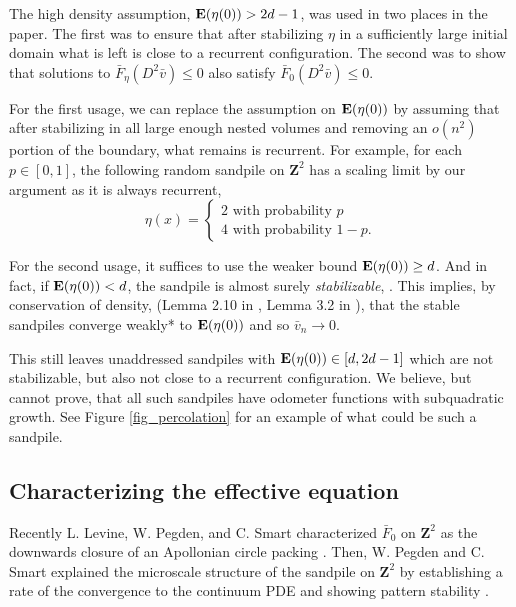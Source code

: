 \documentclass[12pt]{amsart}
\newcommand{\Z}{\mathbf{Z}}
\newcommand{\E}{\mathop{\bf E{}}}
\begin{document}
The high density assumption, $\E(\eta(0)) > 2 d -1$, was used in two places in the paper. The first was to ensure 
that after stabilizing $\eta$ in a sufficiently large initial domain what is left is close to a recurrent configuration. 
The second was to show that solutions to $\bar{F}_{\eta}(D^2 \bar{v}) \leq 0$ also satisfy $\bar{F}_0(D^2 \bar{v}) \leq 0$.  

For the first usage, we can replace the assumption on $\E(\eta(0))$ by assuming that after stabilizing in all large enough nested volumes and removing an $o(n^2)$ portion of the boundary, what remains is recurrent.  For example, for each $p \in [0,1]$,
the following random sandpile on $\Z^2$ has a scaling limit by our argument as it is always recurrent,
\[
\eta(x) =  \begin{cases} 
2  \mbox{ with probability $p$}  \\
4 \mbox{ with probability $1 - p$}.
\end{cases}
\]

For the second usage, it suffices to use the weaker bound $\E(\eta(0)) \geq d$. And in fact,  if $\E(\eta(0)) < d$, the sandpile is almost surely {\it stabilizable}, \cite{fey2009stabilizability}. This implies, by conservation of density, (Lemma 2.10 in \cite{fey2009stabilizability}, Lemma 3.2 in \cite{levine2016divisible}), that the stable sandpiles converge weakly* to $\E(\eta(0))$ and so $\bar{v}_n \to 0$. 

This still leaves unaddressed sandpiles with $\E(\eta(0)) \in [d, 2d-1]$ which are not stabilizable, but also not close to a recurrent configuration. We believe, but cannot prove, that all such sandpiles have odometer functions with subquadratic growth.  See Figure \ref{fig_percolation} for an example of what could be such a sandpile. 



\subsection{Characterizing the effective equation} 
Recently L. Levine, W. Pegden, and C. Smart characterized $\bar{F}_0$ on $\Z^2$ as the downwards closure of an Apollonian circle packing \cite{levine2016apollonian, levine2017apollonian}. Then, W. Pegden and C. Smart explained the microscale structure of the sandpile on $\Z^2$ by establishing a rate of the convergence to the continuum PDE and showing pattern stability \cite{pegden2017stability}. 
\end{document}
